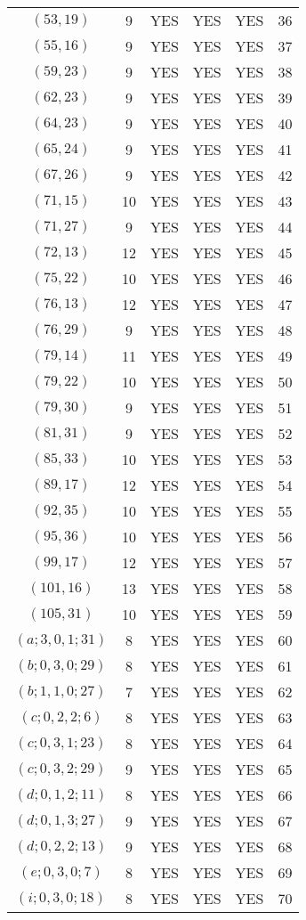 \begin{longtable}{|c|c|c|c|c|c|}
$(53, 19)$ & 9 & YES & YES & YES & 36\\
$(55, 16)$ & 9 & YES & YES & YES & 37\\
$(59, 23)$ & 9 & YES & YES & YES & 38\\
$(62, 23)$ & 9 & YES & YES & YES & 39\\
$(64, 23)$ & 9 & YES & YES & YES & 40\\
$(65, 24)$ & 9 & YES & YES & YES & 41\\
$(67, 26)$ & 9 & YES & YES & YES & 42\\
$(71, 15)$ & 10 & YES & YES & YES & 43\\
$(71, 27)$ & 9 & YES & YES & YES & 44\\
$(72, 13)$ & 12 & YES & YES & YES & 45\\
$(75, 22)$ & 10 & YES & YES & YES & 46\\
$(76, 13)$ & 12 & YES & YES & YES & 47\\
$(76, 29)$ & 9 & YES & YES & YES & 48\\
$(79, 14)$ & 11 & YES & YES & YES & 49\\
$(79, 22)$ & 10 & YES & YES & YES & 50\\
$(79, 30)$ & 9 & YES & YES & YES & 51\\
$(81, 31)$ & 9 & YES & YES & YES & 52\\
$(85, 33)$ & 10 & YES & YES & YES & 53\\
$(89, 17)$ & 12 & YES & YES & YES & 54\\
$(92, 35)$ & 10 & YES & YES & YES & 55\\
$(95, 36)$ & 10 & YES & YES & YES & 56\\
$(99, 17)$ & 12 & YES & YES & YES & 57\\
$(101, 16)$ & 13 & YES & YES & YES & 58\\
$(105, 31)$ & 10 & YES & YES & YES & 59\\
$(a; 3, 0, 1; 31)$ & 8 & YES & YES & YES & 60\\
$(b; 0, 3, 0; 29)$ & 8 & YES & YES & YES & 61\\
$(b; 1, 1, 0; 27)$ & 7 & YES & YES & YES & 62\\
$(c; 0, 2, 2; 6)$ & 8 & YES & YES & YES & 63\\
$(c; 0, 3, 1; 23)$ & 8 & YES & YES & YES & 64\\
$(c; 0, 3, 2; 29)$ & 9 & YES & YES & YES & 65\\
$(d; 0, 1, 2; 11)$ & 8 & YES & YES & YES & 66\\
$(d; 0, 1, 3; 27)$ & 9 & YES & YES & YES & 67\\
$(d; 0, 2, 2; 13)$ & 9 & YES & YES & YES & 68\\
$(e; 0, 3, 0; 7)$ & 8 & YES & YES & YES & 69\\
$(i; 0, 3, 0; 18)$ & 8 & YES & YES & YES & 70
\end{longtable}
